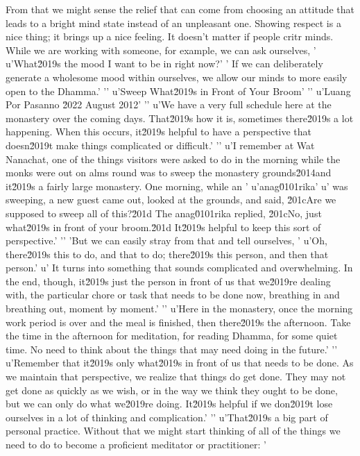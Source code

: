 From that we might sense the relief that can come from choosing an 
attitude that leads to a bright mind state instead of an unpleasant 
one. Showing respect is a nice thing; it brings up a nice feeling. It 
doesn't matter if people critr minds. While we are working with someone, for example, we can ask ourselves, '
u'What\u2019s the mood I want to be in right now?'
' If we can deliberately generate a wholesome mood within ourselves, we allow our minds to more easily open to the Dhamma.'
'\n'
u'Sweep What\u2019s in Front of Your Broom'
'\n'
u'Luang Por Pasanno \u2022 August 2012'
'\n'
u'We have a very full schedule here at the monastery over the coming days. That\u2019s how it is, sometimes there\u2019s a lot happening. When this occurs, it\u2019s helpful to have a perspective that doesn\u2019t make things complicated or difficult.'
'\n'
u'I remember at Wat Nanachat, one of the things visitors were asked to do in the morning while the monks were out on alms round was to sweep the monastery grounds\u2014and it\u2019s a fairly large monastery. One morning, while an '
u'anag\u0101rika'
u' was sweeping, a new guest came out, looked at the grounds, and said, \u201cAre we supposed to sweep all of this?\u201d The anag\u0101rika replied, \u201cNo, just what\u2019s in front of your broom.\u201d It\u2019s helpful to keep this sort of perspective.'
'\n'
'But we can easily stray from that and tell ourselves, '
u'Oh, there\u2019s this to do, and that to do; there\u2019s this person, and then that person.'
u' It turns into something that sounds complicated and overwhelming. In the end, though, it\u2019s just the person in front of us that we\u2019re dealing with, the particular chore or task that needs to be done now, breathing in and breathing out, moment by moment.'
'\n'
u'Here in the monastery, once the morning work period is over and the meal is finished, then there\u2019s the afternoon. Take the time in the afternoon for meditation, for reading Dhamma, for some quiet time. No need to think about the things that may need doing in the future.'
'\n'
u'Remember that it\u2019s only what\u2019s in front of us that needs to be done. As we maintain that perspective, we realize that things do get done. They may not get done as quickly as we wish, or in the way we think they ought to be done, but we can only do what we\u2019re doing. It\u2019s helpful if we don\u2019t lose ourselves in a lot of thinking and complication.'
'\n'
u'That\u2019s a big part of personal practice. Without that we might start thinking of all of the things we need to do to become a proficient meditator or practitioner: '
